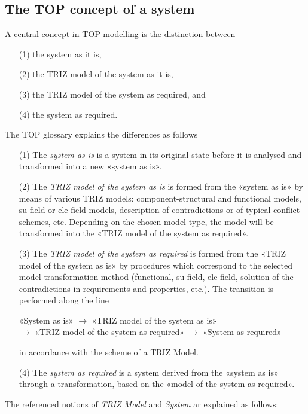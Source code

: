 \documentclass[11pt,a4paper]{article}
\begin{document}
\subsection{The TOP concept of a system}

A central concept in TOP modelling is the distinction between
\begin{itemize}[noitemsep]
\item [(1)] the system as it is,
\item [(2)] the TRIZ model of the system as it is,
\item [(3)] the TRIZ model of the system as required, and 
\item [(4)] the system as required. 
\end{itemize}
The TOP glossary \cite{TOP-Glossary} explains the differences as follows
\begin{itemize}[noitemsep]
\item [(1)] The \emph{system as is} is a system in its original state before
  it is analysed and transformed into a new «system as is».
\item [(2)] The \emph{TRIZ model of the system as is} is formed from the
  «system as is» by means of various TRIZ models: component-structural and
  functional models, su-field or ele-field models, description of
  contradictions or of typical conflict schemes, etc. Depending on the chosen
  model type, the model will be transformed into the «TRIZ model of the system
  as required».
\item [(3)] The \emph{TRIZ model of the system as required} is formed from the
  «TRIZ model of the system as is» by procedures which correspond to the
  selected model transformation method (functional, su-field, ele-field,
  solution of the contradictions in requirements and properties, etc.). The
  transition is performed along the line
  \begin{center}
    «System as is» $\to$ «TRIZ model of the system as is»\\ $\to$ «TRIZ model
    of the system as required» $\to$ «System as required»
  \end{center}
  in accordance with the scheme of a TRIZ Model.
\item [(4)] The \emph{system as required} is a system derived from the «system
  as is» through a transformation, based on the «model of the system as
  required».
 \end{itemize}
The referenced notions of \emph{TRIZ Model} and \emph{System} ar explained as
follows:
\end{document}

